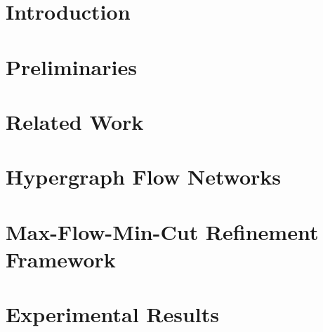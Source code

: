 \documentclass[12pt,a4paper,twoside, enabledeprecatedfontcommands]{scrartcl}
\numberwithin{equation}{section}
\begin{document}

\section{Introduction}



\newpage


\section{Preliminaries}
\label{sec:preliminaries}



\newpage


\section{Related Work}
\label{sec:related_work}



\newpage


\section{Hypergraph Flow Networks}
\label{sec:opt_flow_network}


\newpage


\section{Max-Flow-Min-Cut Refinement Framework}
\label{sec:flow_refinement}



\newpage


\section{Experimental Results}
\label{sec:experiments}
\end{document}

